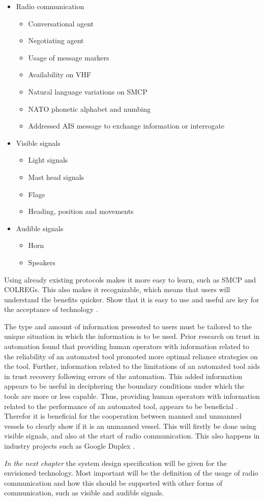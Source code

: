 \begin{itemize}
	\item Radio communication
	\begin{itemize}
		\item Conversational agent
		\item Negotiating agent
		\item Usage of message markers
		\item Availability on \ac{VHF}
		\item Natural language variations on \ac{SMCP}
		\item NATO phonetic alphabet and numbing
		\item Addressed \ac{AIS} message to exchange information or interrogate
	\end{itemize}
	\item Visible signals
	\begin{itemize}
		\item Light signals
		\item Mast head signals
		\item Flags
		\item Heading, position and movements
	\end{itemize}
	\item Audible signals
	\begin{itemize}
		\item Horn
		\item Speakers
	\end{itemize}
\end{itemize}

Using already existing protocols makes it more easy to learn, such as \acf{SMCP} and \ac{COLREGs}. This also makes it recognizable, which means that users will understand the benefits quicker. Show that it is easy to use and useful are key for the acceptance of technology \cite{Davis1989}.

The type and amount of information presented to users must be tailored to the unique situation in which the information is to be used. Prior research on trust in automation found that providing human operators with information related to the reliability of an automated tool promoted more optimal reliance strategies on the tool. Further, information related to the limitations of an automated tool aids in trust recovery following errors of the automation. This added information appears to be useful in deciphering the boundary conditions under which the tools are more or less capable. Thus, providing human operators with information related to the performance of an automated tool, appears to be beneficial \cite{Lyons2014}. Therefor it is beneficial for the cooperation between manned and unmanned vessels to clearly show if it is an unmanned vessel. This will firstly be done using visible signals, and also at the start of radio communication. This also happens in industry projects such as Google Duplex \cite{Nieva2018}.

\vspace{1.5cm}
\emph{In the next chapter} the system design specification will be given for the envisioned technology. Most important will be the definition of the usage of radio communication and how this should be supported with other forms of communication, such as visible and audible signals.
